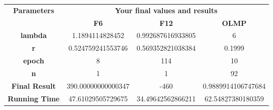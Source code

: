 \documentclass[10pt,letterpaper]{article}
\begin{document}
\begin{table}[H]
\begin{tabular}{|c|c|c|c|}
\hline
\multirow{2}{*}{\textbf{Parameters}} & \multicolumn{3}{c|}{\textbf{Your final values and results}} \\ \cline{2-4} 
                                     & \textbf{F6}        & \textbf{F12}      & \textbf{OLMP}      \\ \hline
\textbf{lambda}                      & 1.1894114828452    & 0.992687616933805 & 6                  \\ \hline
\textbf{r}                           & 0.524759241553746  & 0.569352821038384 & 0.1999             \\ \hline
\textbf{epoch}                       & 8                  & 114               & 10                 \\ \hline
\textbf{n}                           & 1                  & 1                 & 92                 \\ \hline
\textbf{Final Result}                & 390.00000000000347 & -460              & 0.9889914106747684 \\ \hline
\textbf{Running Time}                & 47.61029505729675  & 34.49642562866211 & 62.54827380180359  \\ \hline
\end{tabular}
\end{table}
\end{document}
